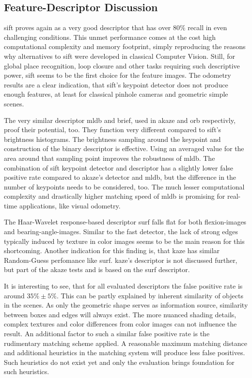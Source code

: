\subsection{Feature-Descriptor Discussion}

\acrshort{sift} proves again as a very good descriptor that has over $80\%$ recall in even challenging conditions.
This unmet performance comes at the cost high computational complexity and memory footprint, simply reproducing the reasons why alternatives to \acrshort{sift} were developed in classical Computer Vision.
Still, for global place recognition, loop closure and other tasks requiring such descriptive power, \acrshort{sift} seems to be the first choice for the feature images.
The odometry results are a clear indication, that \acrshort{sift}'s keypoint detector does not produce enough features, at least for classical pinhole cameras and geometric simple scenes.

The very similar descriptor \acrshort{mldb} and \acrshort{brief}, used in \acrshort{akaze} and \acrshort{orb} respectivly, proof their potential, too.
They function very different compared to \acrshort{sift}'s brightness histograms.
The brightness sampling around the keypoint and construction of the binary descriptor is effective.
Using an averaged value for the area around that sampling point improves the robustness of \acrshort{mldb}.
The combination of \acrshort{sift} keypoint detector and descriptor has a slightly lower false positive rate compared to \acrshort{akaze}'s detector and \acrshort{mldb}, but the difference in the number of keypoints needs to be considered, too.
The much lesser computational complexity and drastically higher matching speed of \acrshort{mldb} is promising for real-time applications, like visual odometry.

The Haar-Wavelet response-based descriptor \acrshort{surf} falls flat for both \glspl{flexion-image} and \glspl{bearing-angle-image}.
Similar to the \acrshort{fast} detector, the lack of strong edges typically induced by texture in color images seems to be the main reason for this shortcoming.
Another indication for this finding is, that \acrshort{kaze} has similar Random-Guess perfomance like \acrshort{surf}.
\acrshort{kaze}'s descriptor is not discussed further, but part of the \acrshort{akaze} tests and is based on the \acrshort{surf} descriptor.

It is interesting to see, that for all evaluated descriptors the false positive rate is around $35\% \pm 5\%$.
This can be partly explained by inherent similarity of objects in the scenes.
As only the geometric shape serves as information source, similarity between boxes and edges will always exist.
The more nuanced shading details, complex textures and color differences from color images can not influence the result.
An additional factor to such a similar false positive rate is the rudimentary matching scheme applied.
A reasonable maximum matching distance and additional heuristics in the matching system will produce less false positives.
Such heuristics do not exist yet and only the evaluation brings foundation for such heuristics.
